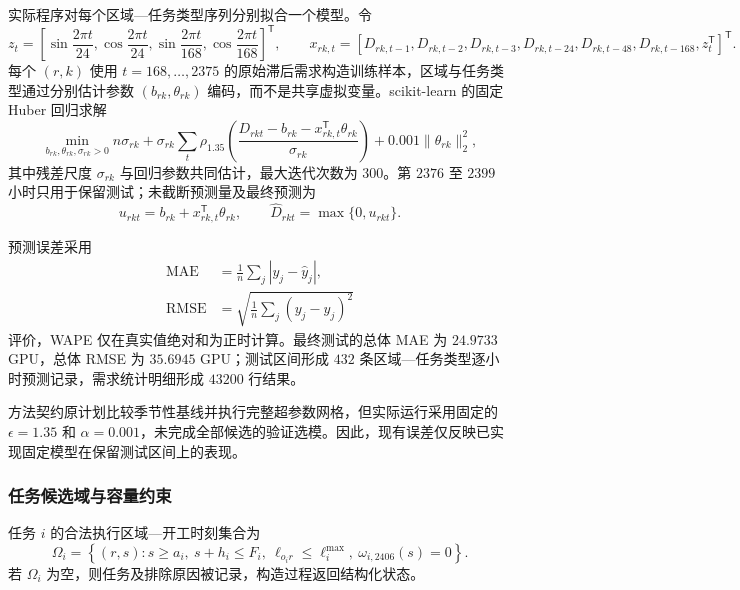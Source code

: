 \documentclass[withoutpreface,bwprint]{cumcmthesis}
\begin{document}
实际程序对每个区域—任务类型序列分别拟合一个模型。令
\begin{equation}
z_t=\left[
\sin\frac{2\pi t}{24},
\cos\frac{2\pi t}{24},
\sin\frac{2\pi t}{168},
\cos\frac{2\pi t}{168}
\right]^{\mathsf T},\qquad
x_{rk,t}=\left[D_{rk,t-1},D_{rk,t-2},D_{rk,t-3},D_{rk,t-24},D_{rk,t-48},D_{rk,t-168},z_t^{\mathsf T}\right]^{\mathsf T}.
\end{equation}
每个 $(r,k)$ 使用 $t=168,\ldots,2375$ 的原始滞后需求构造训练样本，区域与任务类型通过分别估计参数 $(b_{rk},\theta_{rk})$ 编码，而不是共享虚拟变量。scikit-learn 的固定 Huber 回归求解
\begin{equation}
\min_{b_{rk},\theta_{rk},\sigma_{rk}>0}
 n\sigma_{rk}+\sigma_{rk}\sum_t
 \rho_{1.35}\!\left(\frac{D_{rkt}-b_{rk}-x_{rk,t}^{\mathsf T}\theta_{rk}}{\sigma_{rk}}\right)
 +0.001\lVert\theta_{rk}\rVert_2^2,
\end{equation}
其中残差尺度 $\sigma_{rk}$ 与回归参数共同估计，最大迭代次数为 $300$。第 $2376$ 至 $2399$ 小时只用于保留测试；未截断预测量及最终预测为
\begin{equation}
u_{rkt}=b_{rk}+x_{rk,t}^{\mathsf T}\theta_{rk},\qquad
\widehat D_{rkt}=\max\{0,u_{rkt}\}.
\end{equation}

预测误差采用
\begin{align}
\mathrm{MAE}&=\frac{1}{n}\sum_j|y_j-\widehat y_j|,\\
\mathrm{RMSE}&=\sqrt{\frac{1}{n}\sum_j(y_j-\widehat y_j)^2}
\end{align}
评价，WAPE 仅在真实值绝对和为正时计算。最终测试的总体 MAE 为 $24.9733$ GPU，总体 RMSE 为 $35.6945$ GPU；测试区间形成 $432$ 条区域—任务类型逐小时预测记录，需求统计明细形成 $43200$ 行结果。

方法契约原计划比较季节性基线并执行完整超参数网格，但实际运行采用固定的 $\epsilon=1.35$ 和 $\alpha=0.001$，未完成全部候选的验证选模。因此，现有误差仅反映已实现固定模型在保留测试区间上的表现。

\subsubsection{任务候选域与容量约束}

任务 $i$ 的合法执行区域—开工时刻集合为
\begin{equation}
\Omega_i=\left\{(r,s):s\ge a_i,\ s+h_i\le F_i,\
\ell_{o_ir}\le\ell_i^{\max},\ \omega_{i,2406}(s)=0\right\}.
\end{equation}
若 $\Omega_i$ 为空，则任务及排除原因被记录，构造过程返回结构化状态。
\end{document}
